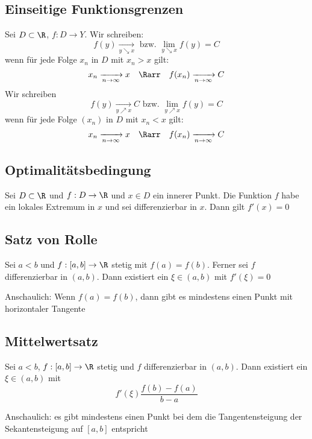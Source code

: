 	\subsection{Einseitige Funktionsgrenzen}
		\begin{Definition} 
			Sei $D\subset \R$, $f:D \to Y$. Wir schreiben:
			$$
				f(y)\xrightarrow[y\searrow x]{} \text{ bzw. } \lim_{y\searrow x}f(y) = C
			$$
			wenn für jede Folge $x_n$ in $D$ mit $x_n > x$ gilt:
			$$
				x_n \xrightarrow[n\to\infty]{}x \quad \Rarr \quad f(x_n)\xrightarrow[n\to\infty]{}C
			$$
			Wir schreiben
			$$
				f(y)\xrightarrow[y\nearrow x]{}C \text{ bzw. } \lim_{y\nearrow x}f(y)=C
			$$
			wenn für jede Folge $(x_n)$ in $D$ mit $x_n < x$ gilt:
			$$
				x_n\xrightarrow[n\to\infty]{}x \quad \Rarr \quad f(x_n)\xrightarrow[n\to\infty]{}C
			$$
		\end{Definition}
	\subsection{Optimalitätsbedingung}
		\begin{Satz} [ ]
			Sei $D\subset \R$ und $f: D \to \R$ und $x\in D$ ein innerer Punkt. Die Funktion $f$ habe ein lokales Extremum in $x$ und sei differenzierbar in $x$. Dann gilt $f'(x)=0$
		\end{Satz}
	\subsection{Satz von Rolle}
		\begin{Satz} [ Rolle]
			Sei $a < b$ und $f: [a, b]\to\R$ stetig mit $f(a) = f(b)$. Ferner sei $f$ differenzierbar in $(a, b)$. Dann existiert ein $\xi\in(a, b)$ mit $f'(\xi)=0$
		\end{Satz}
		Anschaulich: Wenn $f(a) = f(b)$, dann gibt es mindestens einen Punkt mit horizontaler Tangente		
	\subsection{Mittelwertsatz}
		\begin{Satz} [ Mittelwert]
			Sei $a<b$, $f:[a, b]\to\R$ stetig und $f$ differenzierbar in $(a, b)$. Dann existiert ein $\xi\in(a, b)$ mit
			$$
				f'(\xi)\frac{f(b)-f(a)}{b - a}
			$$
		\end{Satz}
		Anschaulich: es gibt mindestens einen Punkt bei dem die Tangentensteigung der Sekantensteigung auf $[a, b]$ entspricht
